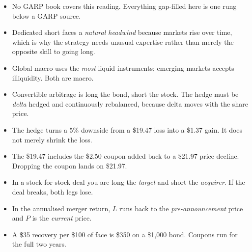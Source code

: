 \begin{imtrapbox}[title={Consolidated trap summary --- IM-8}]
\begin{itemize}
\item {} No GARP book covers this reading. Everything
gap-filled here is one rung below a GARP source.
\item {} Dedicated short faces a \emph{natural headwind}
because markets rise over time, which is why the strategy needs unusual expertise
rather than merely the opposite skill to going long.
\item {} Global macro uses the \emph{most} liquid
instruments; emerging markets accepts illiquidity. Both are macro.
\item {} Convertible arbitrage is long the bond, short the
stock. The hedge must be \emph{delta} hedged and continuously rebalanced, because
delta moves with the share price.
\item {} The hedge turns a 5\% downside from a \$19.47 loss into
a \$1.37 gain. It does not merely shrink the loss.
\item {} The \$19.47 includes the \$2.50 coupon
added back to a \$21.97 price decline. Dropping the coupon lands on \$21.97.
\item {} In a stock-for-stock deal you are long the
\emph{target} and short the \emph{acquirer}. If the deal breaks, both legs lose.
\item {} In the annualised merger return, $L$ runs back to
the \emph{pre-announcement} price and $P$ is the \emph{current} price.
\item {} A \$35 recovery per \$100 of face is
\$350 on a \$1,000 bond. Coupons run for the full two years.
\end{itemize}
\end{imtrapbox}

